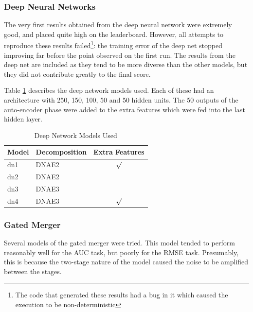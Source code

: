 \documentclass{article}
\begin{document}
\subsubsection{Deep Neural Networks}

The very first results obtained from the deep neural network were extremely good, and placed quite high on the leaderboard.  However, all attempts to reproduce these results failed\footnote{The code that generated these results had a bug in it which caused the execution to be non-deterministic}: the training error of the deep net stopped improving far before the point observed on the first run.  The results from the deep net are included as they tend to be more diverse than the other models, but they did not contribute greatly to the final score.

Table \ref{table:deep-net-models} describes the deep network models used.  Each of these had an architecture with 250, 150, 100, 50 and 50 hidden units.  The 50 outputs of the auto-encoder phase were added to the extra features which were fed into the last hidden layer.

\begin{table}
\caption{Deep Network Models Used}
\label{table:deep-net-models}
\vskip 0.15in
\begin{center}
\begin{small}
\begin{sc}
\begin{tabular}{llc}
\hline
\abovespace\belowspace
Model & Decomposition & Extra Features \\
\hline
\abovespace
dn1   & DNAE2  & $\surd$  \\
dn2   & DNAE2  &   \\
dn3   & DNAE3  &   \\
\belowspace
dn4   & DNAE3  & $\surd$  \\
\hline
\end{tabular}
\end{sc}
\end{small}
\end{center}
\vskip -0.1in
\end{table}



\subsubsection{Gated Merger}

Several models of the gated merger were tried.  This model tended to perform reasonably well for the AUC task, but poorly for the RMSE task.  Presumably, this is because the two-stage nature of the model caused the noise to be amplified between the stages.
\end{document}
